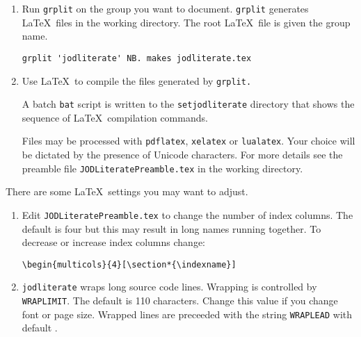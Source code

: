 \begin{enumerate}[1.]
\begin{verbatim}
setjodliterate ''  NB. current JOD put dictionary document directory

setjodliterate 'c:\temp'          NB. windows
setjodliterate '/home/john/temp'  NB. linux
\end{verbatim}
\item
  Run \texttt{grplit} on the group you want to document. \texttt{grplit}
  generates \LaTeX~files in the working directory. The root \LaTeX~file
  is given the group name.

\begin{verbatim}
grplit 'jodliterate' NB. makes jodliterate.tex 
\end{verbatim}
\item
  Use \LaTeX~to compile the files generated by \texttt{grplit.} 

  A batch \texttt{bat} script is written to the \texttt{setjodliterate}
  directory that shows the sequence of \LaTeX\ compilation commands.
  
  Files
  may be processed with \texttt{pdflatex}, \texttt{xelatex} or
  \texttt{lualatex}. Your choice will be dictated by the presence of
  Unicode characters. For more details see the preamble file
  \texttt{JODLiteratePreamble.tex} in the working directory.
\end{enumerate}

There are some \LaTeX~settings you may want to adjust.

\begin{enumerate}[1.]
\item
  Edit \texttt{JODLiteratePreamble.tex} to change the number of index
  columns. The default is four but this may result in long names running
  together. To decrease or increase index columns change:

\begin{verbatim}
\begin{multicols}{4}[\section*{\indexname}]
\end{verbatim}
\item
  \texttt{jodliterate} wraps long source code lines. Wrapping is
  controlled by \texttt{WRAPLIMIT}. The default is 110 characters.
  Change this value if you change font or page size. Wrapped lines are
  preceeded with the string \texttt{WRAPLEAD} with default
  .
\end{enumerate}
